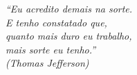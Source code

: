 \begin{epigrafe}
    \vspace*{\fill}
	\begin{flushright}
		\textit{``Eu acredito demais na sorte.\\ 					E tenho constatado que, \\
        		quanto mais duro eu trabalho,\\ 				mais sorte eu tenho.''\\
		          (Thomas Jefferson)}
	\end{flushright}
\end{epigrafe}
